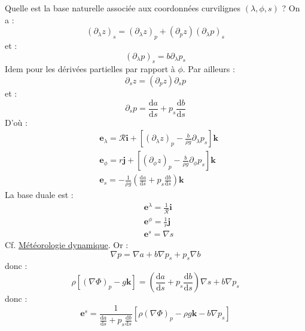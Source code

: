 \documentclass[a4paper,french]{article}
\newcommand{\ud}{\mathrm{d}}
\begin{document}
Quelle est la base naturelle associée aux coordonnées curvilignes
$(\lambda, \phi, s)$ ? On a :
\begin{equation*}
  (\partial_\lambda z)_s
  = (\partial_\lambda z)_p + (\partial_p z) (\partial_\lambda p)_s
\end{equation*}
et :
\begin{equation*}
  (\partial_\lambda p)_s = b \partial_\lambda p_s
\end{equation*}
Idem pour les dérivées partielles par rapport à $\phi$. Par ailleurs :
\begin{equation*}
  \partial_s z = (\partial_p z) \partial_s p
\end{equation*}
et :
\begin{equation*}
  \partial_s p = \frac{\ud a}{\ud s} + p_s \frac{\ud b}{\ud s}
\end{equation*}
D'où :
\begin{align*}
  & \mathbf{e}_\lambda
  = \mathscr{R} \mathbf{i}
    +
    \left[
    (\partial_\lambda z)_p - \frac{b}{\rho g} \partial_\lambda p_s
    \right]
    \mathbf{k} \\
  & \mathbf{e}_\phi
    =  r \mathbf{j}
    +
    \left[
    (\partial_\phi z)_p - \frac{b}{\rho g} \partial_\phi p_s
    \right]
    \mathbf{k} \\
  & \mathbf{e}_s
    = - \frac{1}{\rho g}
    \left(\frac{\ud a}{\ud s} + p_s \frac{\ud b}{\ud s} \right) \mathbf{k}
\end{align*}
La base duale est :
\begin{align*}
  & \mathbf{e}^\lambda = \frac{1}{\mathscr{R}} \mathbf{i} \\
  & \mathbf{e}^\phi = \frac{1}{r} \mathbf{j} \\
  & \mathbf{e}^s = \nabla s
\end{align*}
Cf. \href{../../../../Apprentissage/Dynamic_meteorology_texfol/dynamic_meteorology.pdf}{Météorologie
  dynamique}. Or :
\begin{equation*}
  \nabla p = \nabla a + b \nabla p_s + p_s \nabla b
\end{equation*}
donc :
\begin{equation*}
  \rho [(\nabla \Phi)_p - g \mathbf{k}]
  = \left(\frac{\ud a}{\ud s} + p_s \frac{\ud b}{\ud s} \right) \nabla s
  + b \nabla p_s
\end{equation*}
donc :
\begin{equation*}
  \mathbf{e}^s
  = \frac{1}{\frac{\ud a}{\ud s} + p_s \frac{\ud b}{\ud s}}
  [\rho (\nabla \Phi)_p - \rho g \mathbf{k} - b \nabla p_s]
\end{equation*}
\end{document}
